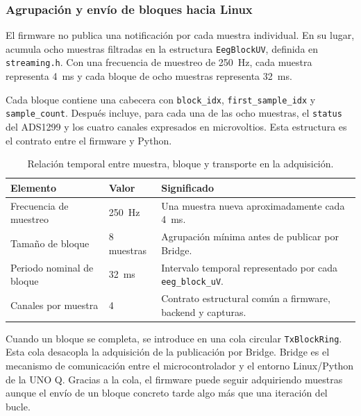 \subsubsection{Agrupación y envío de bloques hacia Linux}

El firmware no publica una notificación por cada muestra individual. En su lugar, acumula ocho muestras filtradas en la estructura \texttt{EegBlockUV}, definida en \texttt{streaming.h}. Con una frecuencia de muestreo de \SI{250}{\hertz}, cada muestra representa \SI{4}{\milli\second} y cada bloque de ocho muestras representa \SI{32}{\milli\second}.

Cada bloque contiene una cabecera con \texttt{block\_idx}, \texttt{first\_sample\_idx} y \texttt{sample\_count}. Después incluye, para cada una de las ocho muestras, el \texttt{status} del ADS1299 y los cuatro canales expresados en microvoltios. Esta estructura es el contrato entre el firmware y Python.

\begin{table}[H]
    \centering
    \caption{Relación temporal entre muestra, bloque y transporte en la adquisición.}
    \label{tab:impl_tiempos_adquisicion}
    \begin{tabular}{p{}p{}p{}}
        \hline
        \textbf{Elemento} & \textbf{Valor} & \textbf{Significado} \\
        \hline
        Frecuencia de muestreo & \SI{250}{\hertz} & Una muestra nueva aproximadamente cada \SI{4}{\milli\second}. \\
        Tamaño de bloque & 8 muestras & Agrupación mínima antes de publicar por Bridge. \\
        Periodo nominal de bloque & \SI{32}{\milli\second} & Intervalo temporal representado por cada \texttt{eeg\_block\_uV}. \\
        Canales por muestra & 4 & Contrato estructural común a firmware, backend y capturas. \\
        \hline
    \end{tabular}
\end{table}

Cuando un bloque se completa, se introduce en una cola circular \texttt{TxBlockRing}. Esta cola desacopla la adquisición de la publicación por Bridge. Bridge es el mecanismo de comunicación entre el microcontrolador y el entorno Linux/Python de la UNO Q. Gracias a la cola, el firmware puede seguir adquiriendo muestras aunque el envío de un bloque concreto tarde algo más que una iteración del bucle.

